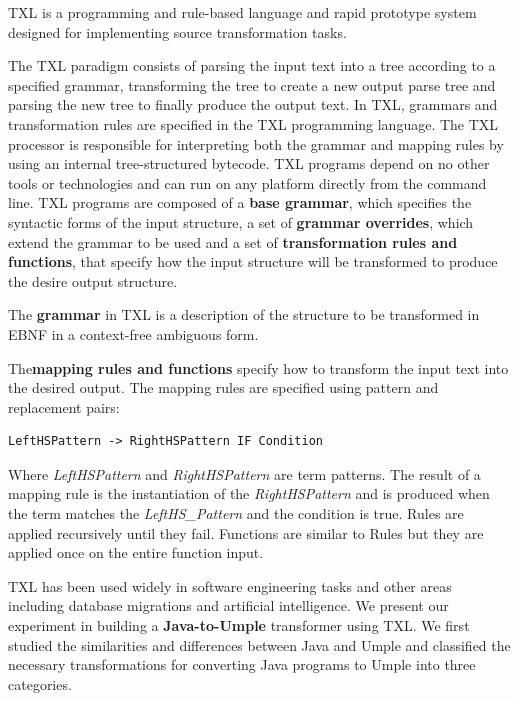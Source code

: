 TXL \cite{Cordy2006} is a programming and rule-based language and rapid prototype system designed for implementing source transformation tasks. 

The TXL paradigm consists of parsing the input text into a tree according to a specified grammar, transforming the tree to create a new output parse tree and parsing the new tree to finally produce the output text. In TXL, grammars and transformation rules are specified in the TXL programming language. The TXL processor is responsible for interpreting both the grammar and mapping rules by using an internal tree-structured bytecode. TXL programs depend on no other tools or technologies and can run on any platform directly from the command line.
TXL programs are composed of a\textbf{ base grammar}, which specifies the syntactic forms of the input structure, a set of \textbf{grammar overrides}, which extend the grammar to be used and a set of \textbf{transformation rules and functions}, that specify how the input structure will be transformed to produce the desire output structure.

The \textbf{grammar} in TXL is a description of the structure to be transformed in EBNF in a context-free ambiguous form.

The\textbf{mapping rules and functions} specify how to transform the input text into the desired output. The mapping rules are specified using pattern and replacement pairs: 

\vspace{\baselineskip}
\begin{lstlisting}[style=umplePlain]
LeftHSPattern -> RightHSPattern IF Condition
\end{lstlisting}

Where \textit{LeftHSPattern} and \textit{RightHSPattern} are term patterns. The result of a mapping rule is the instantiation of the \textit{RightHSPattern} and is produced when the term matches the \textit{LeftHS\_Pattern} and the condition is true. Rules are applied recursively until they fail. Functions are similar to Rules but they are applied once on the entire function input.

TXL has been used widely in software engineering tasks and other areas including database migrations and artificial intelligence. We present our experiment in building a \textbf{Java-to-Umple} transformer using TXL. We first studied the similarities and differences between Java and Umple and classified the necessary transformations for converting Java programs to Umple into three categories.

